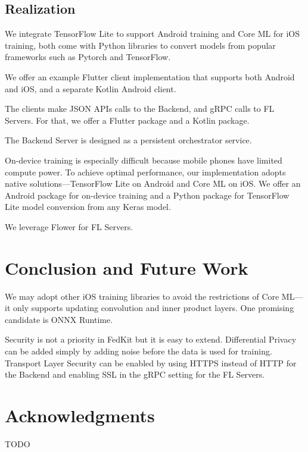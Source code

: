 \documentclass[letterpaper]{article} %
\begin{document}
\subsection{Realization}

We integrate TensorFlow Lite to support Android training and Core ML for iOS
training,
both come with Python libraries to convert models from popular
frameworks such as Pytorch and TensorFlow.

We offer an example Flutter client implementation that supports both Android and
iOS, and a separate Kotlin Android client.

The clients make JSON APIs calls to the Backend,
and gRPC calls to FL Servers.
For that, we offer a Flutter package and a Kotlin package.

The Backend Server is designed as a persistent orchestrator service.

On-device training is especially difficult because mobile phones have limited
compute power.
To achieve optimal performance, our implementation adopts native
solutions---TensorFlow Lite on Android and Core ML on iOS.
We offer an Android package for on-device training and a Python package for
TensorFlow Lite model conversion from any Keras model.

We leverage Flower \cite{beutel2020flower} for FL Servers.

\section{Conclusion and Future Work}


We may adopt other iOS training libraries to avoid the restrictions of Core
ML---it only supports updating convolution and inner product layers.
One promising candidate is ONNX Runtime.

Security is not a priority in FedKit but it is easy to extend.
Differential Privacy can be added simply by adding noise before the data is
used for training.
Transport Layer Security can be enabled by
using HTTPS instead of HTTP for the Backend and
enabling SSL in the gRPC setting for the FL Servers.

\appendix

\section*{Acknowledgments}
TODO

\bigskip


\end{document}
